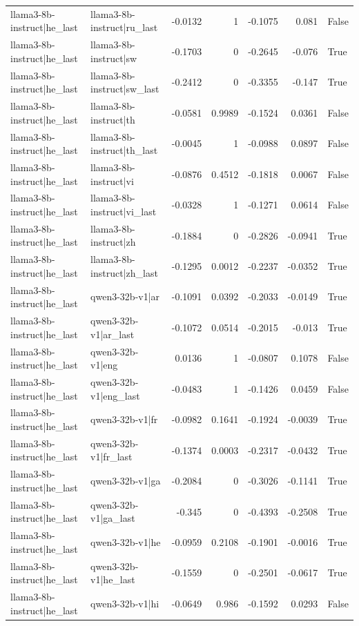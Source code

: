 \begin{table}
\begin{tabular}{l l r r r r l}
llama3-8b-instruct|he_last & llama3-8b-instruct|ru_last & -0.0132 & 1 & -0.1075 & 0.081 & False \\
llama3-8b-instruct|he_last & llama3-8b-instruct|sw & -0.1703 & 0 & -0.2645 & -0.076 & True \\
llama3-8b-instruct|he_last & llama3-8b-instruct|sw_last & -0.2412 & 0 & -0.3355 & -0.147 & True \\
llama3-8b-instruct|he_last & llama3-8b-instruct|th & -0.0581 & 0.9989 & -0.1524 & 0.0361 & False \\
llama3-8b-instruct|he_last & llama3-8b-instruct|th_last & -0.0045 & 1 & -0.0988 & 0.0897 & False \\
llama3-8b-instruct|he_last & llama3-8b-instruct|vi & -0.0876 & 0.4512 & -0.1818 & 0.0067 & False \\
llama3-8b-instruct|he_last & llama3-8b-instruct|vi_last & -0.0328 & 1 & -0.1271 & 0.0614 & False \\
llama3-8b-instruct|he_last & llama3-8b-instruct|zh & -0.1884 & 0 & -0.2826 & -0.0941 & True \\
llama3-8b-instruct|he_last & llama3-8b-instruct|zh_last & -0.1295 & 0.0012 & -0.2237 & -0.0352 & True \\
llama3-8b-instruct|he_last & qwen3-32b-v1|ar & -0.1091 & 0.0392 & -0.2033 & -0.0149 & True \\
llama3-8b-instruct|he_last & qwen3-32b-v1|ar_last & -0.1072 & 0.0514 & -0.2015 & -0.013 & True \\
llama3-8b-instruct|he_last & qwen3-32b-v1|eng & 0.0136 & 1 & -0.0807 & 0.1078 & False \\
llama3-8b-instruct|he_last & qwen3-32b-v1|eng_last & -0.0483 & 1 & -0.1426 & 0.0459 & False \\
llama3-8b-instruct|he_last & qwen3-32b-v1|fr & -0.0982 & 0.1641 & -0.1924 & -0.0039 & True \\
llama3-8b-instruct|he_last & qwen3-32b-v1|fr_last & -0.1374 & 0.0003 & -0.2317 & -0.0432 & True \\
llama3-8b-instruct|he_last & qwen3-32b-v1|ga & -0.2084 & 0 & -0.3026 & -0.1141 & True \\
llama3-8b-instruct|he_last & qwen3-32b-v1|ga_last & -0.345 & 0 & -0.4393 & -0.2508 & True \\
llama3-8b-instruct|he_last & qwen3-32b-v1|he & -0.0959 & 0.2108 & -0.1901 & -0.0016 & True \\
llama3-8b-instruct|he_last & qwen3-32b-v1|he_last & -0.1559 & 0 & -0.2501 & -0.0617 & True \\
llama3-8b-instruct|he_last & qwen3-32b-v1|hi & -0.0649 & 0.986 & -0.1592 & 0.0293 & False \\

\end{tabular}
\end{table}
